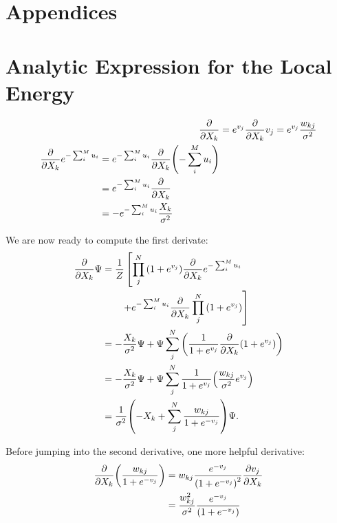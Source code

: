 \documentclass[a4paper, 11pt]{article}
\begin{document}
\pagebreak
\begin{multicols}{2}
    \appendix
    \section*{Appendices}

    \section{Analytic Expression for the Local Energy}
    \label{app:E-L-derivation}

   \begin{align}
        \pdv{}{X_k} (1+e^{v_j}) &=e^{v_j}\pdv{}{X_k}v_j =
        e^{v_j} \frac{w_{kj}}{\sigma^2}\\
        \begin{split}
        \pdv{}{X_k}e^{-\sum_i^M u_i} &= e^{-\sum_i^M
        u_i}\pdv{}{X_k}\qty(-\sum_i^M u_i) \\
        &= e^{-\sum_i^M u_i}\pdv{}{X_k} (-u_k) \\
        &= -e^{-\sum_i^M u_i} \frac{X_k}{\sigma^2}
        \end{split}
    \end{align}

    We are now ready to compute the first derivate:
    \begin{align*}
        \pdv{}{X_k}\Psi &= \frac{1}{Z} \left[\prod_j^N
        \qty(1+e^{v_j})\pdv{}{X_k}e^{-\sum_i^M u_i}\right.\\
        &\quad{  }\quad{    }\left. + e^{-\sum_i^M
        u_i}\pdv{}{X_k} \prod_j^N \qty(1+e^{v_j})\right]\\
        &= -\frac{X_k}{\sigma^2}\Psi + \Psi \sum_j^N
        \qty(\frac{1}{1+e^{v_j}}\pdv{}{X_k}\qty(1+e^{v_j}))\\
        &= -\frac{X_k}{\sigma^2}\Psi + \Psi\sum_j^N
        \frac{1}{1+e^{v_j}}\qty(\frac{w_{kj}}{\sigma^2} e^{v_j})\\
        &= \frac{1}{\sigma^2}\qty(-X_k + \sum_j^N
        \frac{w_{kj}}{1+e^{-v_j}})\Psi.
    \end{align*}

    Before jumping into the second derivative, one more helpful derivative:
    \begin{align}
        \begin{split}
        \pdv{}{X_k}\qty(\frac{w_{kj}}{1+e^{-v_j}}) &=
        w_{kj}\frac{e^{-v_j}}{\qty(1+e^{-v_j})^2}\pdv{v_j}{X_k}\\
        &= \frac{w_{kj}^2}{\sigma^2} \frac{e^{-v_j}}{\qty(1+e^{-v_j})}
        \end{split}
    \end{align}


\end{multicols}
\end{document}

